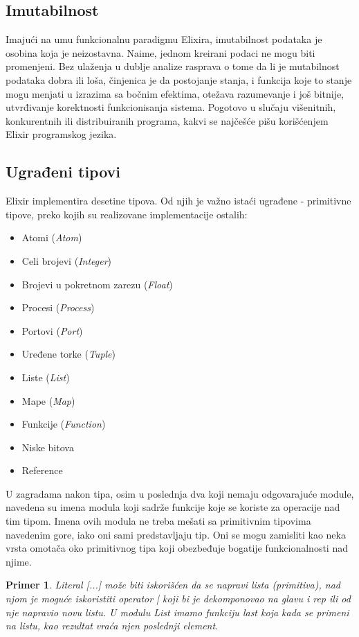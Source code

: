 \documentclass[a4paper]{article}
\newtheorem{primer}{Primer}[section]
\begin{document}
\subsection{Imutabilnost}
\label{sec:tipovi}
Imajući na umu funkcionalnu paradigmu Elixira, imutabilnost podataka je osobina koja je neizostavna. Naime, jednom kreirani podaci ne mogu biti promenjeni. Bez ulaženja u dublje analize rasprava o tome da li je mutabilnost podataka dobra ili loša, činjenica je da postojanje stanja, i funkcija koje to stanje mogu menjati u izrazima sa bočnim efektima, otežava razumevanje i još bitnije, utvrđivanje korektnosti funkcionisanja sistema. Pogotovo u slučaju višenitnih, konkurentnih ili distribuiranih programa, kakvi se najčešće pišu korišćenjem Elixir programskog jezika. %

\subsection{Ugrađeni tipovi}
\label{sec:tipovi}
Elixir implementira desetine tipova. Od njih je važno istaći ugrađene - primitivne tipove, preko kojih su realizovane implementacije ostalih:
\begin{multicols}{2}
\begin{itemize}
  \item Atomi (\textit{Atom})
  \item Celi brojevi (\textit{Integer})
  \item Brojevi u pokretnom zarezu (\textit{Float})
  \item Procesi (\textit{Process})
  \item Portovi (\textit{Port})
  \item Uređene torke (\textit{Tuple})
  \item Liste (\textit{List})
  \item Mape (\textit{Map})
  \item Funkcije (\textit{Function})
  \item Niske bitova 
  \item Reference
\end{itemize}
\end{multicols}

U zagradama nakon tipa, osim u poslednja dva koji nemaju odgovarajuće module, navedena su imena modula koji sadrže funkcije koje se koriste za operacije nad tim tipom. Imena ovih modula ne treba mešati sa primitivnim tipovima navedenim gore, iako oni sami predstavljaju tip. Oni se mogu zamisliti kao neka vrsta omotača oko primitivnog tipa koji obezbeđuje bogatije funkcionalnosti nad njime. 
\begin{primer}
Literal [...] može biti iskorišćen da se napravi lista (primitiva), nad njom je moguće iskoristiti operator | koji bi je dekomponovao na glavu i rep ili od nje napravio novu listu. U modulu \textit{List} imamo funkciju \textit{last} koja kada se primeni na listu, kao rezultat vraća njen poslednji element.
\end{primer}
\end{document}
